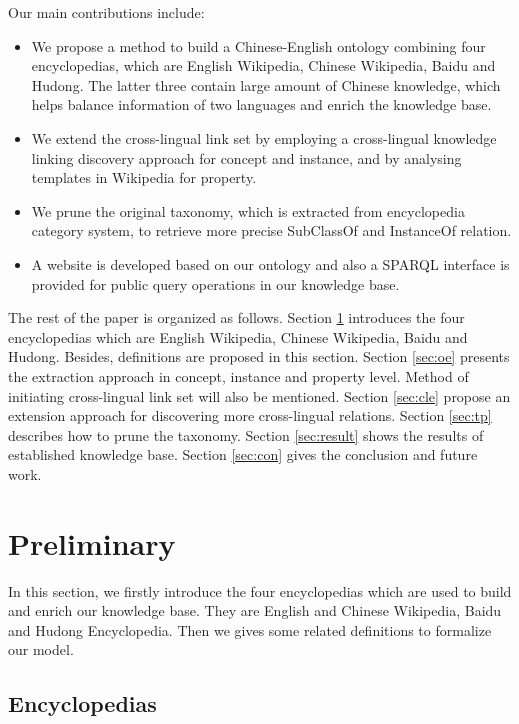 \documentclass[runningheads,a4paper]{llncs}
\begin{document}
Our main contributions include:
\begin{itemize}
  \item We propose a method to build a Chinese-English ontology combining four encyclopedias, which are English Wikipedia, Chinese Wikipedia, Baidu and Hudong. The latter three contain large amount of Chinese knowledge, which helps balance information of two languages and enrich the knowledge base.
  \item We extend the cross-lingual link set by employing a cross-lingual knowledge linking discovery approach for concept and instance, and by analysing templates in Wikipedia for property.
  \item We prune the original taxonomy, which is extracted from encyclopedia category system, to retrieve more precise SubClassOf and InstanceOf relation.
  \item A website is developed based on our ontology and also a SPARQL interface is provided for public query operations in our knowledge base.
\end{itemize}

The rest of the paper is organized as follows. Section \ref{sec:pre} introduces the four encyclopedias which are English Wikipedia, Chinese Wikipedia, Baidu and Hudong. Besides, definitions are proposed in this section. Section \ref{sec:oe} presents the extraction approach in concept, instance and property level. Method of initiating cross-lingual link set will also be mentioned. Section \ref{sec:cle} propose an extension approach for discovering more cross-lingual relations. Section \ref{sec:tp} describes how to prune the taxonomy. Section \ref{sec:result} shows the results of established knowledge base. Section \ref{sec:con} gives the conclusion and future work.

\section{Preliminary}
\label{sec:pre}
In this section, we firstly introduce the four encyclopedias which are used to build and enrich our knowledge base. They are English and Chinese Wikipedia, Baidu and Hudong Encyclopedia. Then we gives some related definitions to formalize our model.

\subsection{Encyclopedias}
\label{sec:encyclopedias}
\end{document}
